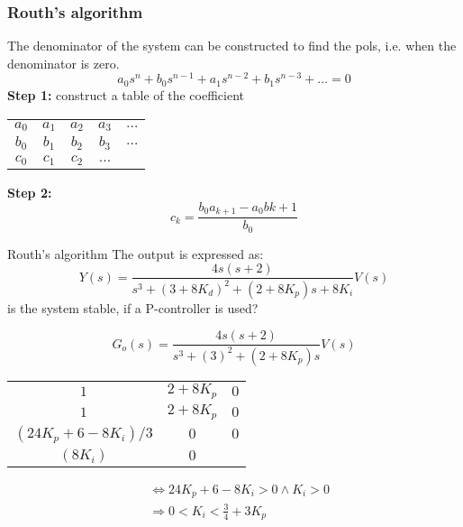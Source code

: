 \documentclass{article}
\begin{document}
\subsubsection{Routh's algorithm}
The denominator of the system can be constructed to find the pols, i.e. when the denominator 
is zero.
\begin{equation*}
   a_0s^{n} + b_0s^{n-1} + a_1s^{n-2} + b_1s^{n-3} + \ldots = 0
\end{equation*}
\textbf{Step 1:} construct a table of the coefficient
\begin{center}
    \begin{tabular}{ c c c c c }
     $a_0$ & $a_1$ & $a_2$ & $a_3$ & $\ldots$ \\ 
     $b_0$ & $b_1$ & $b_2$ & $b_3$ & $\ldots$ \\ 
     $c_0$ & $c_1$ & $c_2$ & $\ldots$ & \\ 
    \end{tabular}
\end{center}

\textbf{Step 2:}
\begin{equation*}
    c_k = \frac{b_0a_{k+1} - a_0b{k+1}}{b_0}
\end{equation*}

\begin{exampleblock}{Routh's algorithm}
    The output is expressed as:
    \begin{equation*}
        Y(s) = \frac{4s(s+2)}{s^3+(3+8K_d)^2+(2+8K_p)s+8K_i}V(s)
    \end{equation*}
    is the system stable, if a P-controller is used?

    \begin{equation*}
        G_o(s) = \frac{4s(s+2)}{s^3+(3)^2+(2+8K_p)s}V(s)
    \end{equation*}

    \begin{center}
    \begin{tabular}{ c c c }
     $1$ & $2+8K_p$ & $0$ \\ 
     $1$ & $2+8K_p$ & $0$ \\ 
     $(24K_p+6-8K_i)/3$ & $0$ & $0$ \\
     $(8K_i)$ & $0$ &  \\
    \end{tabular}
    \end{center}

    \begin{align*}
        &\Leftrightarrow 24K_p + 6 - 8K_i > 0 \land K_i > 0 \\
        &\Rightarrow 0 < K_i < \frac{3}{4} + 3K_p
    \end{align*}
\end{exampleblock}
\end{document}
